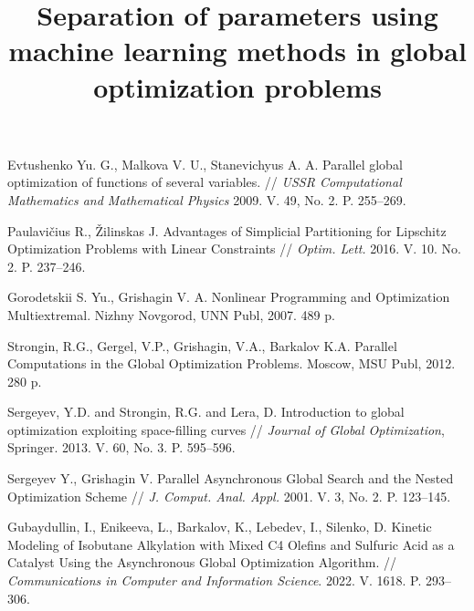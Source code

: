 \documentclass[11pt, oneside, a4paper]{article}
\begin{document}
\newpage

\title{Separation of parameters using machine learning methods in global optimization problems}




\begin{biblioen}

 Evtushenko Yu. G., Malkova V. U., Stanevichyus A. A. Parallel global optimization of functions of several variables. // {\it USSR Computational Mathematics and Mathematical Physics} 2009. V. 49, No. 2. P. 255--269.

 Paulavi{\v c}ius R., {\v Z}ilinskas J. Advantages of Simplicial Partitioning for Lipschitz Optimization Problems with Linear Constraints // {\it Optim. Lett.} 2016. V. 10. No. 2. P. 237--246.

 Gorodetskii S. Yu., Grishagin V. A. Nonlinear Programming and Optimization Multiextremal. Nizhny Novgorod, UNN Publ, 2007. 489 p.

 Strongin, R.G., Gergel, V.P., Grishagin, V.A., Barkalov K.A. Parallel Computations in the Global Optimization Problems. Moscow, MSU Publ, 2012. 280 p.

 Sergeyev, Y.D. and Strongin, R.G. and Lera, D. Introduction to global optimization exploiting space-filling curves // {\it Journal of Global Optimization}, Springer. 2013. V. 60, No. 3. P. 595--596.

 Sergeyev Y., Grishagin V. Parallel Asynchronous Global Search and the Nested Optimization Scheme // {\it J. Comput. Anal. Appl.} 2001. V. 3, No. 2. P. 123--145.

 Gubaydullin, I., Enikeeva, L., Barkalov, K., Lebedev, I., Silenko, D. Kinetic Modeling of Isobutane Alkylation with Mixed C4 Olefins and Sulfuric Acid as a Catalyst Using the Asynchronous Global Optimization Algorithm. // {\it Communications in Computer and Information Science}. 2022. V. 1618.  P. 293--306. 

\end{biblioen}
\end{document}

